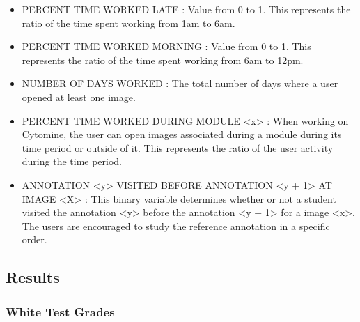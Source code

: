 \documentclass[a4paper,11pt]{report}
\numberwithin{figure}{section} %
\begin{document}
\begin{itemize}
    \item[\textbullet] PERCENT TIME WORKED LATE : Value from 0 to 1. This represents the ratio of the time spent working from 1am to 6am.
        
    \item[\textbullet] PERCENT TIME WORKED MORNING : Value from 0 to 1. This represents the ratio of the time spent working from 6am to 12pm.
    
    \item[\textbullet] NUMBER OF DAYS WORKED : The total number of days where a user opened at least one image.
    
    \item[\textbullet] PERCENT TIME WORKED DURING MODULE <x> : When working on Cytomine, the user can open images associated during a module during its time period or outside of it. This represents the ratio of the user activity during the time period.
    
	\item[\textbullet] ANNOTATION <y> VISITED BEFORE ANNOTATION <y + 1> AT IMAGE <X> : This binary variable determines whether or not a student visited the annotation <y> before the annotation <y + 1> for a image <x>. The users are encouraged to study the reference annotation in a specific order.    
    
    \end{itemize}
    

    
    \subsection{Results}
    
    \subsubsection{White Test Grades}
    
\end{document}
